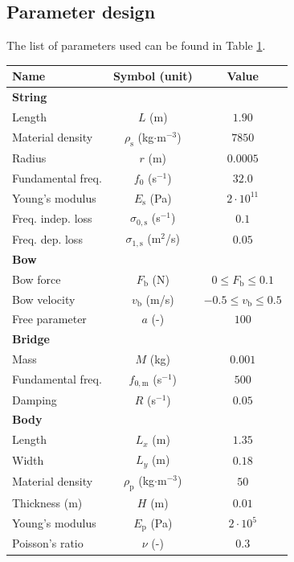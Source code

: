 \documentclass[dvipsnames, pdftex]{article}
\begin{document}
\subsection{Parameter design}
The list of parameters used can be found in Table \ref{tab:parameters}. 
\begin{table}[t]\label{tab:parameters}
\small
\begin{center}
\begin{tabular}{|l|c|c|}
    \hline
    Name & Symbol (unit) & Value\\ \hline
    \multicolumn{3}{|l|}{\bf String}\\ \hline
    Length & $L$ (m) & $1.90$\\
    Material density & $\rho_\text{s}$ (kg$\cdot$m$^{-3}$) & $7850$\\ 
    Radius & $r$ (m) & $0.0005$\\
    Fundamental freq. & $f_0$ (s$^{-1}$)& $32.0$\\ 
    Young's modulus & $E_\text{s}$ (Pa) & $2\cdot 10^{11}$\\
    Freq. indep. loss & $\sigma_{0,\text{s}}$ (s$^{-1}$) & $0.1$\\ 
    Freq. dep. loss & $\sigma_{1,\text{s}}$ (m$^2$/s) & $0.05$\\ \hline
    \multicolumn{3}{|l|}{\bf Bow}\\ \hline
    Bow force & $F_\text{b}$ (N) & $0 \leq F_\text{b} \leq 0.1 $\\
    Bow velocity & $v_\text{b}$ (m/s) & $-0.5 \leq v_\text{b} \leq 0.5 $\\
    Free parameter & $a$ (-) & $100$\\\hline
    \multicolumn{3}{|l|}{\bf Bridge}\\ \hline
    Mass & $M$ (kg) & $0.001$\\ 
    Fundamental freq. & $f_{0,\text{m}}$ (s$^{-1}$) & $500$\\ 
    Damping & $R$ (s$^{-1}$)& $0.05$\\
    \hline
    \multicolumn{3}{|l|}{\bf Body}\\ \hline
    Length & $L_x$ (m)& $1.35$\\ 
    Width & $L_y$ (m)& $0.18$\\ 
    Material density & $\rho_\text{p}$ (kg$\cdot$m$^{-3}$)& $50$\\ 
    Thickness (m) & $H$ (m) & $0.01$\\ 
    Young's modulus & $E_\text{p}$ (Pa) & $2\cdot 10^{5}$\\ 
    Poisson's ratio & $\nu$ (-)& $0.3$\\

\end{tabular}
\end{center}
\end{table}
\end{document}
